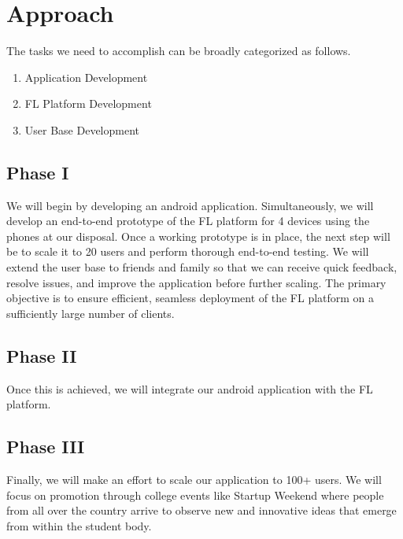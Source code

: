\section{Approach}
    The tasks we need to accomplish can be broadly categorized as follows. \newline

    \begin{enumerate}
        \item Application Development
        \item FL Platform Development
        \item User Base Development
    \end{enumerate}

    \subsection{Phase I}
    We will begin by developing an android application.
    Simultaneously, we will develop an end-to-end prototype of the FL platform for 4 devices using the phones at our disposal.
    Once a working prototype is in place, the next step will be to scale it to 20 users and perform thorough end-to-end testing. We will extend the user base to friends and family so that we can receive quick feedback, resolve issues, and improve the application before further scaling.
    The primary objective is to ensure efficient, seamless deployment of the FL platform on a sufficiently large number of clients.
    \subsection{Phase II}
    Once this is achieved, we will integrate our android application with the FL platform.
    \subsection{Phase III}
    Finally, we will make an effort to scale our application to 100+ users. We will focus on promotion through college events like Startup Weekend where people from all over the country arrive to observe new and innovative ideas that emerge from within the student body.

    \begin{table}[t]
        
    \end{table}

